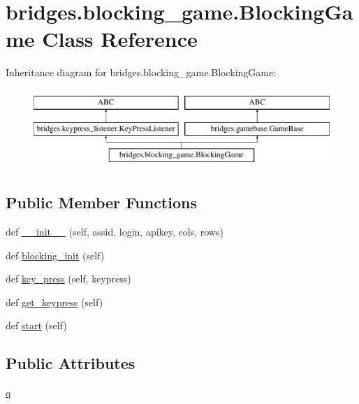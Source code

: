 \hypertarget{classbridges_1_1blocking__game_1_1_blocking_game}{}\section{bridges.\+blocking\+\_\+game.\+Blocking\+Game Class Reference}
\label{classbridges_1_1blocking__game_1_1_blocking_game}
Inheritance diagram for bridges.\+blocking\+\_\+game.\+Blocking\+Game\+:\begin{figure}[H]
\begin{center}
\leavevmode
\includegraphics[height=3.000000cm]{classbridges_1_1blocking__game_1_1_blocking_game}
\end{center}
\end{figure}
\subsection*{Public Member Functions}
\begin{DoxyCompactItemize}
\item 
def \hyperlink{classbridges_1_1blocking__game_1_1_blocking_game_ae2575c068499e269e2279695d5f598b4}{\+\_\+\+\_\+init\+\_\+\+\_\+} (self, assid, login, apikey, cols, rows)
\item 
def \hyperlink{classbridges_1_1blocking__game_1_1_blocking_game_ab37e3832bd1220a060484419888f8072}{blocking\+\_\+init} (self)
\item 
def \hyperlink{classbridges_1_1blocking__game_1_1_blocking_game_aa8cda5f9304b87b66f6794a1b1f5a7db}{key\+\_\+press} (self, keypress)
\item 
def \hyperlink{classbridges_1_1blocking__game_1_1_blocking_game_a4dd145a1378d6f96112b8b73343e296a}{get\+\_\+keypress} (self)
\item 
def \hyperlink{classbridges_1_1blocking__game_1_1_blocking_game_ab7a2a5d6d83b2e72800ddffa3c0ad818}{start} (self)
\end{DoxyCompactItemize}
\subsection*{Public Attributes}
\begin{DoxyCompactItemize}
\item 
\hyperlink{classbridges_1_1blocking__game_1_1_blocking_game_a21d2b164100c6cd61a36f8704c69e51f}{q}
\end{DoxyCompactItemize}

